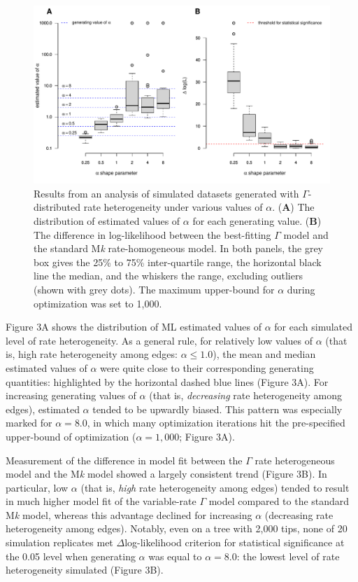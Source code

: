 \documentclass[fleqn,10pt,lineno]{wlpeerj} %
\begin{document}
\begin{figure}
\includegraphics[width=1\linewidth]{Revell-and-Harmon.fitgammaMk.PeerJ_files/figure-latex/unnamed-chunk-5-1} \caption{Results from an analysis of simulated datasets generated with $\Gamma$-distributed rate heterogeneity under various values of $\alpha$. (\textbf{A}) The distribution of estimated values of $\alpha$ for each generating value. (\textbf{B}) The difference in log-likelihood between the best-fitting $\Gamma$ model and the standard M\emph{k} rate-homogeneous model. In both panels, the grey box gives the 25\% to 75\% inter-quartile range, the horizontal black line the median, and the whiskers the range, excluding outliers (shown with grey dots). The maximum upper-bound for $\alpha$ during optimization was set to 1,000.}\label{fig:unnamed-chunk-5}
\end{figure}

Figure 3A shows the distribution of ML estimated values of \(\alpha\) for each simulated level of rate heterogeneity. As a general rule, for relatively low values of \(\alpha\) (that is, high rate heterogeneity among edges: \(\alpha \le 1.0\)), the mean and median estimated values of \(\alpha\) were quite close to their corresponding generating quantities: highlighted by the horizontal dashed blue lines (Figure 3A). For increasing generating values of \(\alpha\) (that is, \emph{decreasing} rate heterogeneity among edges), estimated \(\alpha\) tended to be upwardly biased. This pattern was especially marked for \(\alpha = 8.0\), in which many optimization iterations hit the pre-specified upper-bound of optimization (\(\alpha = 1,000\); Figure 3A).

Measurement of the difference in model fit between the \(\Gamma\) rate heterogeneous model and the M\emph{k} model showed a largely consistent trend (Figure 3B). In particular, low \(\alpha\) (that is, \emph{high} rate heterogeneity among edges) tended to result in much higher model fit of the variable-rate \(\Gamma\) model compared to the standard M\emph{k} model, whereas this advantage declined for increasing \(\alpha\) (decreasing rate heterogeneity among edges). Notably, even on a tree with 2,000 tips, none of 20 simulation replicates met \(\Delta\)log-likelihood criterion for statistical significance at the 0.05 level when generating \(\alpha\) was equal to \(\alpha = 8.0\): the lowest level of rate heterogeneity simulated (Figure 3B).
\end{document}
